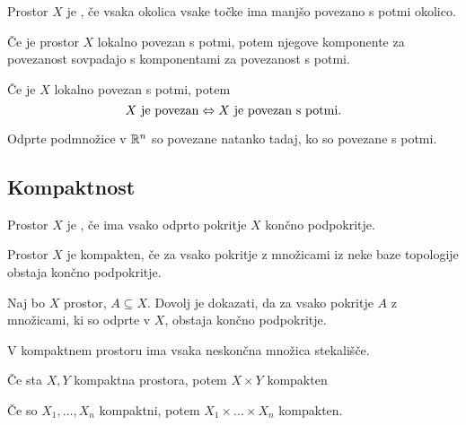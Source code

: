 \begin{opomba}
    Prostor $X$ je , če vsaka okolica vsake točke ima manjšo povezano s potmi okolico.
\end{opomba}

\begin{izrek}
    Če je prostor $X$ lokalno povezan s potmi, potem njegove komponente za povezanost sovpadajo s komponentami za povezanost s potmi.
\end{izrek}

\begin{posledica}
    Če je $X$ lokalno povezan s potmi, potem 
    $$X \text{ je povezan} \Leftrightarrow X \text{ je povezan s potmi}.$$
\end{posledica}

\begin{posledica}
    Odprte podmnožice v $\mathbb{R}^n$ so povezane natanko tadaj, ko so povezane s potmi.
\end{posledica}

\subsection{Kompaktnost}
\begin{definicija}
    Prostor $X$ je , če ima vsako odprto pokritje $X$ končno podpokritje.
\end{definicija}

\begin{trditev}
    Prostor $X$ je kompakten, če za vsako pokritje z množicami iz neke baze topologije obstaja končno podpokritje.
\end{trditev}

\begin{opomba}
    Naj bo $X$ prostor, $A \subseteq X$. Dovolj je dokazati, da za vsako pokritje $A$ z množicami, ki so odprte v $X$, obstaja končno podpokritje.
\end{opomba}

\begin{izrek}
    V kompaktnem prostoru ima vsaka neskončna množica stekališče.
\end{izrek}

\begin{izrek}
    Če sta $X, Y$ kompaktna prostora, potem $X \times Y$ kompakten
\end{izrek}

\begin{posledica}
    Če so $X_1, \ldots, X_n$ kompaktni, potem $X_1 \times \ldots \times X_n$ kompakten.
\end{posledica}

